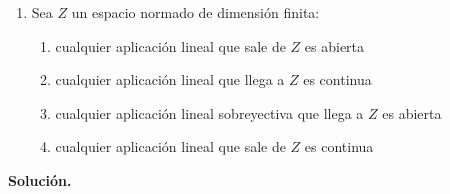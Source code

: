 \documentclass[12pt]{article}
\begin{document}
\begin{ejercicio}
\begin{enumerate}[label=\alph*)]
            \begin{enumerate}[label={d\arabic*)}]
                \item existe $f \in X^*$ tal que $\sup \Re f(C) \leq \Re f(x_0)$
                \item existe $f \in X^*$ tal que $\sup \Re f(C) < \Re f(x_0)$
                \item no se puede asegurar que $C$ se pueda separar de $x_0$ si el interior de $C$ es vacío
                \item existe un único $f \in X^*$ tal que $\sup \Re f(C) \leq \Re f(x_0)$
            \end{enumerate}
            \item Sea $Z$ un espacio normado de dimensión finita:
            \begin{enumerate}[label={e\arabic*)}]
                \item cualquier aplicación lineal que sale de $Z$ es abierta
                \item cualquier aplicación lineal que llega a $Z$ es continua
                \item cualquier aplicación lineal sobreyectiva que llega a $Z$ es abierta
                \item cualquier aplicación lineal que sale de $Z$ es continua
            \end{enumerate}
        \end{enumerate}
    \end{ejercicio}

    \newpage
    \setcounter{ejercicio}{0} %
    \noindent
    \textbf{Solución.}
\end{document}
